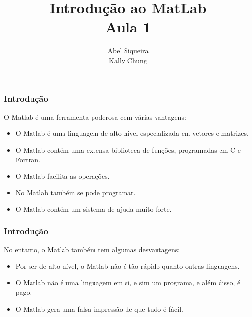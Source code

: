 \documentclass{beamer}
\title{Introdu\c{c}\~ao ao MatLab \\ Aula 1}
\author{Abel Siqueira \\ Kally Chung}
\date{}
\begin{document}
\frame{\titlepage}

\section[Introdu\c{c}\~ao]{}
\frame
{
  \frametitle{Introdu\c{c}\~ao}
  
  O Matlab \'e uma ferramenta poderosa com v\'arias vantagens:
  
  \begin{itemize}
  \item<2-> O Matlab \'e uma linguagem de alto n\'ivel especializada em vetores e matrizes.
  \item<3-> O Matlab cont\'em uma extensa biblioteca de fun\c{c}\~oes, programadas em C e Fortran.
  \item<4-> O Matlab facilita as opera\c{c}\~oes.
  \item<5-> No Matlab tamb\'em se pode programar.
  \item<6-> O Matlab cont\'em um sistema de ajuda muito forte.
  \end{itemize}
}
\frame
{
  \frametitle{Introdu\c{c}\~ao}
  
  No entanto, o Matlab tamb\'em tem algumas desvantagens:
  
  \begin{itemize}
  \item<2-> Por ser de alto n\'ivel, o Matlab n\~ao \'e t\~ao r\'apido quanto outras linguagens.
  \item<3-> O Matlab n\~ao \'e uma linguagem em si, e sim um programa, e al\'em disso, \'e pago.
  \item<4-> O Matlab gera uma falsa impress\~ao de que tudo \'e f\'acil.
  \end{itemize}
  
}
\end{document}

